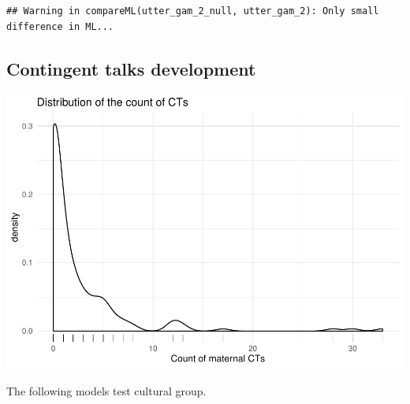 \documentclass[]{article}
\newenvironment{Shaded}{\begin{snugshade}}{\end{snugshade}}
\newcommand{\DataTypeTok}[1]{\textcolor[rgb]{0.13,0.29,0.53}{#1}}
\newcommand{\FloatTok}[1]{\textcolor[rgb]{0.00,0.00,0.81}{#1}}
\newcommand{\KeywordTok}[1]{\textcolor[rgb]{0.13,0.29,0.53}{\textbf{#1}}}
\newcommand{\NormalTok}[1]{#1}
\newcommand{\OperatorTok}[1]{\textcolor[rgb]{0.81,0.36,0.00}{\textbf{#1}}}
\newcommand{\StringTok}[1]{\textcolor[rgb]{0.31,0.60,0.02}{#1}}
\begin{document}
\begin{verbatim}
## Warning in compareML(utter_gam_2_null, utter_gam_2): Only small difference in ML...
\end{verbatim}

\hypertarget{contingent-talks-development}{%
\subsection{Contingent talks
development}\label{contingent-talks-development}}

\begin{Shaded}
\end{Shaded}

\includegraphics{supplement_files/figure-latex/ct-1.pdf}

The following models test cultural group.
\end{document}
